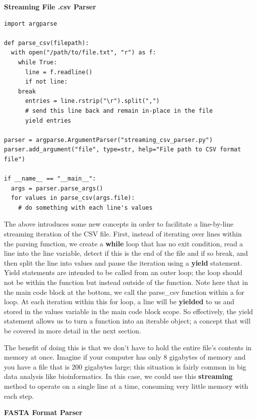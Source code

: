 \documentclass[a4paper,11pt]{article}
\begin{document}
\pagebreak
\textbf{Streaming File .csv Parser}
\vspace{3mm}
\begin{lstlisting}
import argparse

def parse_csv(filepath):
  with open("/path/to/file.txt", "r") as f:
    while True:
      line = f.readline()
      if not line:
	break
      entries = line.rstrip("\r").split(",")
      # send this line back and remain in-place in the file
      yield entries

parser = argparse.ArgumentParser("streaming_csv_parser.py")
parser.add_argument("file", type=str, help="File path to CSV format file")

if __name__ == "__main__":
  args = parser.parse_args()
  for values in parse_csv(args.file):
    # do something with each line's values
\end{lstlisting}
\vspace{3mm}

The above introduces some new concepts in order to facilitate a line-by-line streaming iteration 
of the CSV file.  First, instead of iterating over lines within the parsing function, we create a 
\textbf{while} loop that has no exit condition, read a line into the line variable, detect if this is 
the end of the file and if so break, and then split the line into values and pause the iteration 
using a \textbf{yield} statement.  Yield statements are intended to be called from an outer loop; 
the loop should not be within the function but instead outside of the function.  Note here that 
in the main code block at the bottom, we call the parse\_csv function within a for loop.  At each 
iteration within this for loop, a line will be \textbf{yielded} to us and stored in the values 
variable in the main code block scope.  So effectively, the yield statement allows us to turn a 
function into an iterable object; a concept that will be covered in more detail in the next section. \par

The benefit of doing this is that we don't have to hold the entire file's contents in memory at once.  
Imagine if your computer has only 8 gigabytes of memory and you have a file that is 200 gigabytes large; 
this situation is fairly common in big data analysis like bioinformatics.  In this case, we could 
use this \textbf{streaming} method to operate on a single line at a time, consuming very little 
memory with each step.  

\pagebreak
\textbf{FASTA Format Parser}
\end{document}
